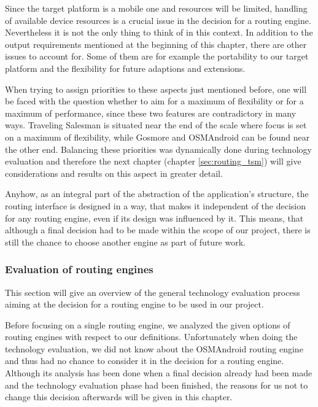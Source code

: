 Since the target platform is a mobile one and resources will be limited, handling of available device resources is a crucial issue in the decision for a routing engine. Nevertheless it is not the only thing to think of in this context. In addition to the output requirements mentioned at the beginning of this chapter, there are other issues to account for. Some of them are for example the portability to our target platform and the flexibility for future adaptions and extensions.\newline

When trying to assign priorities to these aspects just mentioned before, one will be faced with the question whether to aim for a maximum of flexibility or for a maximum of performance, since these two features are contradictory in many ways. Traveling Salesman is situated near the end of the scale where focus is set on a maximum of flexibility, while Gosmore and OSMAndroid can be found near the other end. Balancing these priorities was dynamically done during technology evaluation and therefore the next chapter (chapter \ref{sec:routing_tsm}) will give considerations and results on this aspect in greater detail.\newline

Anyhow, as an integral part of the abstraction of the application's structure, the routing interface is designed in a way, that makes it independent of the decision for any routing engine, even if its design was influenced by it. This means, that although a final decision had to be made within the scope of our project, there is still the chance to choose another engine as part of future work.\newline

\subsubsection{Evaluation of routing engines}

This section will give an overview of the general technology evaluation process aiming at the decision for a routing engine to be used in our project.\newline

Before focusing on a single routing engine, we analyzed the given options of routing engines with respect to our definitions. Unfortunately when doing the technology evaluation, we did not know about the OSMAndroid routing engine and thus had no chance to consider it in the decision for a routing engine. Although its analysis has been done when a final decision already had been made and the technology evaluation phase had been finished, the reasons for us not to change this decision afterwards will be given in this chapter.\newline

